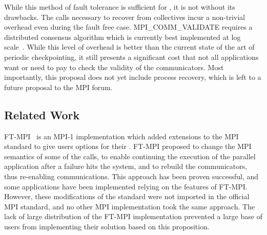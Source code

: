 While this method of fault tolerance is sufficient for \abft, it is
not without its drawbacks. The calls necessary to recover from
collectives incur a non-trivial overhead even during the fault free
case. MPI\_COMM\_VALIDATE requires a distributed consensus algorithm
which is currently best implemented at log
scale~\cite{Hursey11LogConsensus}. While this level of overhead is
better than the current state of the art of periodic checkpointing, it
still presents a significant cost that not all applications want or
need to pay to check the validity of the communicators. Most
importantly, this proposal does not yet include process recovery,
which is left to a future proposal to the MPI forum.



\subsection*{Related Work}

FT-MPI~\cite{fagg2000ft} is an MPI-1 implementation which added
extensions to the MPI standard to give users options for their
\abft. FT-MPI proposed to change the MPI semantics of some of the
calls, to enable continuing the execution of the parallel application
after a failure hits the system, and to rebuild the communicators, thus
re-enabling communications. This approach has been proven successful,
and some applications have been implemented relying on the features of
FT-MPI. However, these modifications of the standard were not imported
in the official MPI standard, and no other MPI implementation took the
same approach. The lack of large distribution of the FT-MPI
implementation prevented a large base of users from implementing their
solution based on this proposition.


